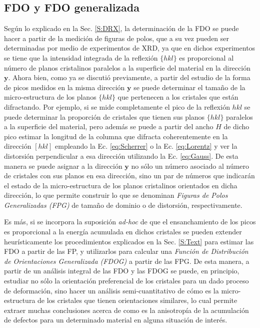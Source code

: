 \subsection{FDO y FDO generalizada}\label{SS:ODFG}
Según lo explicado en la Sec. \ref{S:DRX}, la determinación de la FDO se puede hacer a partir de la medición de figuras de polos, que a su vez pueden ser determinadas por medio de experimentos de XRD, ya que en dichos experimentos se tiene que la intensidad integrada de la reflexión $\{hkl\}$ es proporcional al número de planos cristalinos paralelos a  la superficie del material en la dirección $\mathbf{y}$.
Ahora bien, como ya se discutió previamente, a partir del estudio de la forma de picos medidos en la misma dirección $\mathbf{y}$ se puede determinar el tamaño de la micro-estructura de los planos $\{hkl\}$ que pertenecen a los cristales que están difractando.
Por ejemplo, si se mide completamente el pico de la reflexión $hkl$ se puede determinar la proporción de cristales que tienen sus planos $\{hkl\}$ paralelos a la superficie del material, pero además se puede a partir del ancho $H$ de dicho pico estimar la longitud de la columna que difracta coherentemente en la dirección $[hkl]$ empleando la Ec. \ref{eq:Scherrer} o la Ec. \ref{eq:Lorentz} y ver la distorsión perpendicular a esa dirección utilizando la Ec. \ref{eq:Gauss}.
De esta manera se puede asignar a la dirección $\mathbf{y}$ no sólo un número asociado al número de cristales con sus planos en esa dirección, sino un par de números que indicarán el estado de la micro-estructura de los planos cristalinos orientados en dicha dirección, lo que permite construir lo que se denominan \textit{Figuras de Polos Generalizadas (FPG)} de tamaño de dominio o de distorsión, respectivamente.

Es más, si se incorpora la suposición \textit{ad-hoc} de que el ensanchamiento de los picos es proporcional a la energía acumulada en dichos cristales se pueden extender heurísticamente los procedimientos explicados en la Sec. \ref{S:Text} para estimar las FDO a partir de las FP, y utilizarlos para calcular una \textit{Función de Distribución de Orientaciones Generalizada (FDOG)} a partir de las FPG. 
De esta manera, a partir de un análisis integral de las FDO y las FDOG se puede, en principio, estudiar no sólo la orientación preferencial de los cristales para un dado proceso de deformación, sino hacer un análisis semi-cuantitativo de cómo es la micro-estructura de los cristales que tienen orientaciones similares, lo cual permite extraer muchas conclusiones acerca de como es la anisotropía de la acumulación de defectos para un determinado material en alguna situación de interés. 

